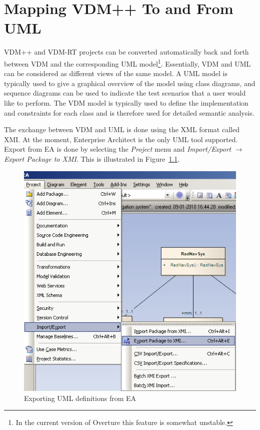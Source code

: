 \documentclass{overturerepchap}
\begin{document}
\chapter{Mapping VDM++ To and From UML}\label{sec:vdmuml}

VDM++ and VDM-RT projects can be converted automatically back and forth between VDM
and the corresponding UML model\footnote{In the current version of
Overture this feature is somewhat unstable.}. 
Essentially, VDM and UML can be considered
as different views of the same model. A UML model is typically used
to give a graphical overview of the model using class diagrams, and
sequence diagrams can be used to indicate the test scenarios
that a user would like to perform. The VDM model is typically used
to define the implementation and constraints for each class and
is therefore used for detailed semantic analysis.

The exchange between VDM and
UML is done using the XML format called XMI. At the moment,
Enterprise Architect is the only UML tool
supported. Export from EA is done by selecting the \emph{Project} menu
and \emph{Import/Export} $\rightarrow$ \emph{Export Package
to XMI}. This is illustrated in Figure~\ref{fig:exportfromUML}.

\begin{figure}[htbp]
\begin{center}
\includegraphics[width=4.5in]{screenDumps/exportfromUML}
\caption{Exporting UML definitions from EA\label{fig:exportfromUML}}
\end{center}
\end{figure}
\end{document}
